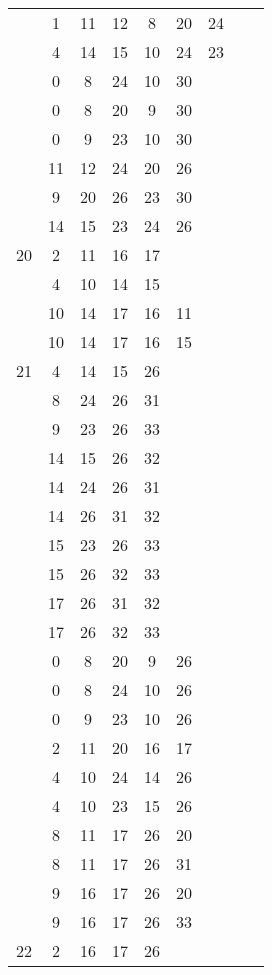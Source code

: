 \begin{table}[H]
\begin{tabular}{|c|cccccccc|}
 & 1 & 11 & 12 & 8 & 20 & 24 &   &  \\
 & 4 & 14 & 15 & 10 & 24 & 23 &   &  \\
 & 0 & 8 & 24 & 10 & 30 &   &   &  \\
 & 0 & 8 & 20 & 9 & 30 &   &   &  \\
 & 0 & 9 & 23 & 10 & 30 &   &   &  \\
 & 11 & 12 & 24 & 20 & 26 &   &   &  \\
 & 9 & 20 & 26 & 23 & 30 &   &   &  \\
 & 14 & 15 & 23 & 24 & 26 &   &   &  \\
\hline
20  & 2 & 11 & 16 & 17 &   &   &   &  \\
 & 4 & 10 & 14 & 15 &   &   &   &  \\
 & 10 & 14 & 17 & 16 & 11 &   &   &  \\
 & 10 & 14 & 17 & 16 & 15 &   &   &  \\
\hline
21  & 4 & 14 & 15 & 26 &   &   &   &  \\
 & 8 & 24 & 26 & 31 &   &   &   &  \\
 & 9 & 23 & 26 & 33 &   &   &   &  \\
 & 14 & 15 & 26 & 32 &   &   &   &  \\
 & 14 & 24 & 26 & 31 &   &   &   &  \\
 & 14 & 26 & 31 & 32 &   &   &   &  \\
 & 15 & 23 & 26 & 33 &   &   &   &  \\
 & 15 & 26 & 32 & 33 &   &   &   &  \\
 & 17 & 26 & 31 & 32 &   &   &   &  \\
 & 17 & 26 & 32 & 33 &   &   &   &  \\
 & 0 & 8 & 20 & 9 & 26 &   &   &  \\
 & 0 & 8 & 24 & 10 & 26 &   &   &  \\
 & 0 & 9 & 23 & 10 & 26 &   &   &  \\
 & 2 & 11 & 20 & 16 & 17 &   &   &  \\
 & 4 & 10 & 24 & 14 & 26 &   &   &  \\
 & 4 & 10 & 23 & 15 & 26 &   &   &  \\
 & 8 & 11 & 17 & 26 & 20 &   &   &  \\
 & 8 & 11 & 17 & 26 & 31 &   &   &  \\
 & 9 & 16 & 17 & 26 & 20 &   &   &  \\
 & 9 & 16 & 17 & 26 & 33 &   &   &  \\
\hline
22  & 2 & 16 & 17 & 26 &   &   &   &  \\

\end{tabular}
\end{table}
